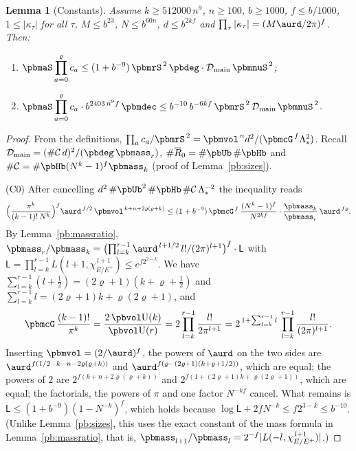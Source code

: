 \documentclass[10pt]{amsart}
\newtheorem{lemma}[theorem]{Lemma}
\theoremstyle{definition}
\theoremstyle{remark}
\providecommand{\auU}{\mathrm U}
\providecommand{\pbDmain}{\mathcal D_{\mathrm{main}}}
\providecommand{\pbR}{\overline R_0}
\begin{document}
\begin{lemma}[Constants]\label{pbm:const}
Assume $k\ge512000\,n^9$, $n\ge100$, $b\ge1000$, $f\le b/1000$, $1\le|\kappa_\tau|$ for all
$\tau$, $M\le b^{23}$, $N\le b^{60n}$, $d\le b^{2kf}$ and $\prod_\tau|\kappa_\tau|=(M\aurd/2\pi)^f$.
Then:
\begin{enumerate}
\item[(C0)] $\displaystyle\pbmaS\prod_{a=0}^{\varrho}c_a\le(1+b^{-9})\,\pbmrS^{\,2}\,\pbdeg\cdot\pbDmain\,
\pbmnuS^{\,2}$;
\item[(C1)] $\displaystyle\pbmaS\prod_{a=0}^{\varrho}c_a\cdot b^{2403\,n^9f}\,\pbmdec\le b^{-10}\,b^{-6kf}\,
\pbmrS^{\,2}\,\pbDmain\,\pbmnuS^{\,2}$.
\end{enumerate}
\end{lemma}
\begin{proof}
From the definitions, $\prod_ac_a/\pbmrS^{\,2}=\pbmvol^{\,n}d^2/(\pbmcG^{\,f}\Lambda_*^2)$. Recall
$\pbDmain=(\#\mathcal C\,d)^2/(\pbdeg\,\pbmass_r)$, $\#\pbR=\#\pbUb\,\#\pbHb$ and $\#\mathcal C=\#\pbHb
(N^k-1)^f\pbmass_k$ (proof of Lemma~\ref{pb:sizes}).

(C0) After cancelling $d^2\,\#\pbUb^2\,\#\pbHb\,\#\mathcal C\,\Lambda_*^{-2}$ the inequality reads
\[
\Bigl(\frac{\pi^k}{(k-1)!\,N^k}\Bigr)^f\aurd^{\,f/2}\,\pbmvol^{\,k+n+2\varrho(\varrho+k)}\le(1+b^{-9})\,\pbmcG^{
\,f}\,\frac{(N^k-1)^f}{N^{2kf}}\cdot\frac{\pbmass_k}{\pbmass_r}\,\aurd^{\,f\varrho}.
\]
By Lemma~\ref{pb:massratio}, $\pbmass_r/\pbmass_k=\bigl(\prod_{l=k}^{r-1}\aurd^{\,l+1/2}\,l!/(2\pi)^{l+1}
\bigr)^f\cdot\mathsf L$ with $\mathsf L=\prod_{l=k}^{r-1}L(l+1,\chi^{\,l+1}_{E/E^+})\le e^{f2^{2-k}}$. We
have $\sum_{l=k}^{r-1}(l+\frac12)=(2\varrho+1)(k+\varrho+\frac12)$ and $\sum_{l=k}^{r-1}l=(2\varrho+1)k+
\varrho(2\varrho+1)$, and
\[
\pbmcG\,\frac{(k-1)!}{\pi^k}=\frac{2\,\pbvol\auU(k)}{\pbvol\auU(r)}=2\prod_{l=k}^{r-1}\frac{l!}{2\pi^{l+1}}=
2^{\,1+\sum_{l=k}^{r-1}l}\,\prod_{l=k}^{r-1}\frac{l!}{(2\pi)^{l+1}} .
\]
Inserting $\pbmvol=(2/\aurd)^f$, the powers of $\aurd$ on the two sides are $\aurd^{f(1/2-k-n-2\varrho(
\varrho+k))}$ and $\aurd^{f(\varrho-(2\varrho+1)(k+\varrho+1/2))}$, which are equal; the powers of $2$
are $2^{f(k+n+2\varrho(\varrho+k))}$ and $2^{f(1+(2\varrho+1)k+\varrho(2\varrho+1))}$, which are equal;
the factorials, the powers of $\pi$ and one factor $N^{-kf}$ cancel. What remains is $\mathsf L\le
(1+b^{-9})(1-N^{-k})^f$, which holds because $\log\mathsf L+2fN^{-k}\le f2^{3-k}\le b^{-10}$. (Unlike
Lemma~\ref{pb:sizes}, this uses the exact constant of the mass formula in
Lemma~\ref{pb:massratio}, that is, $\pbmass_{l+1}/\pbmass_l=2^{-f}|L(-l,\chi_{E/E^+}^{\,l+1})|$.)


\end{proof}
\end{document}
